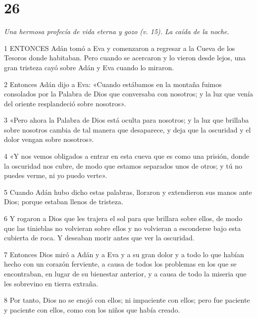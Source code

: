 \chapter{26}

\par \textit{Una hermosa profecía de vida eterna y gozo (v. 15). La caída de la noche.}

\par 1 ENTONCES Adán tomó a Eva y comenzaron a regresar a la Cueva de los Tesoros donde habitaban. Pero cuando se acercaron y lo vieron desde lejos, una gran tristeza cayó sobre Adán y Eva cuando lo miraron.

\par 2 Entonces Adán dijo a Eva: «Cuando estábamos en la montaña fuimos consolados por la Palabra de Dios que conversaba con nosotros; y la luz que venía del oriente resplandeció sobre nosotros».

\par 3 «Pero ahora la Palabra de Dios está oculta para nosotros; y la luz que brillaba sobre nosotros cambia de tal manera que desaparece, y deja que la oscuridad y el dolor vengan sobre nosotros».

\par 4 «Y nos vemos obligados a entrar en esta cueva que es como una prisión, donde la oscuridad nos cubre, de modo que estamos separados unos de otros; y tú no puedes verme, ni yo puedo verte».

\par 5 Cuando Adán hubo dicho estas palabras, lloraron y extendieron sus manos ante Dios; porque estaban llenos de tristeza.

\par 6 Y rogaron a Dios que les trajera el sol para que brillara sobre ellos, de modo que las tinieblas no volvieran sobre ellos y no volvieran a esconderse bajo esta cubierta de roca. Y deseaban morir antes que ver la oscuridad.

\par 7 Entonces Dios miró a Adán y a Eva y a su gran dolor y a todo lo que habían hecho con un corazón ferviente, a causa de todos los problemas en los que se encontraban, en lugar de su bienestar anterior, y a causa de todo la miseria que les sobrevino en tierra extraña.

\par 8 Por tanto, Dios no se enojó con ellos; ni impaciente con ellos; pero fue paciente y paciente con ellos, como con los niños que había creado.

